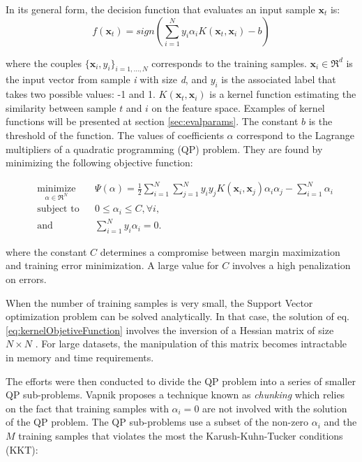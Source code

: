 \documentclass{ipol}
\def\x{{\mathbf x}}
\begin{document}
In its general form, the decision function that evaluates an input sample $\x_t$ is:
\begin{equation}\label{eq:svmoutput}
f(\x_t)= sign \left(\sum_{i=1}^N y_i \alpha_i K(\x_t,\x_i)-b\right)
\end{equation}

\noindent where the couples $\{\x_i,y_i\}_{i=1,...,N}$ corresponds to the training samples.
$\x_i \in \Re^d$ is the input vector from sample \textit{i} with size \textit{d}, and $y_i$ is the associated label that takes two possible values: -1 and 1. 
$K(\x_t,\x_i)$ is a kernel function estimating the similarity between sample $t$ and $i$ on the feature space.
Examples of kernel functions will be presented at section \ref{sec:evalparams}.
The constant $b$ is the threshold of the function.
The values of coefficients $\alpha$ correspond to the Lagrange multipliers of a quadratic programming (QP) problem. 
They are found by minimizing the following objective function:

\begin{equation}\label{eq:kernelObjetiveFunction}
\begin{aligned}
& \underset{\alpha \in \Re^N}{\text{minimize}}
& & \Psi(\alpha)=\frac{1}{2} \sum_{i=1}^N \sum_{j=1}^N y_i y_j K(\x_i,\x_j)\alpha_i \alpha_j - \sum_{i=1}^N \alpha_i \\
& \text{subject to}
& & 0 \leq \alpha_i \leq C, \forall i, \\
&\text{and}&&\sum_{i=1}^N y_i \alpha_i = 0.
\end{aligned}
\end{equation}

\noindent where the constant $C$ determines a compromise between margin maximization and training error minimization.
A large value for $C$ involves a high penalization on errors.

When the number of training samples is very small, the Support Vector optimization problem can be solved analytically.
In that case, the solution of eq. \ref{eq:kernelObjetiveFunction} involves the inversion of a Hessian matrix of size $N \times N$ \cite{Burges1998}.
For large datasets, the manipulation of this matrix becomes intractable in memory and time requirements.

The efforts were then conducted to divide the QP problem into a series of smaller QP sub-problems.
Vapnik \cite{Vapnik:1982} proposes a technique known as \textit{chunking} which relies on the fact that training samples with $\alpha_i=0$ are not involved with the solution of the QP problem.
The QP sub-problems use a subset of the non-zero $\alpha_i$ and the $M$ training samples that violates the most the  Karush-Kuhn-Tucker conditions (KKT):
\end{document}
